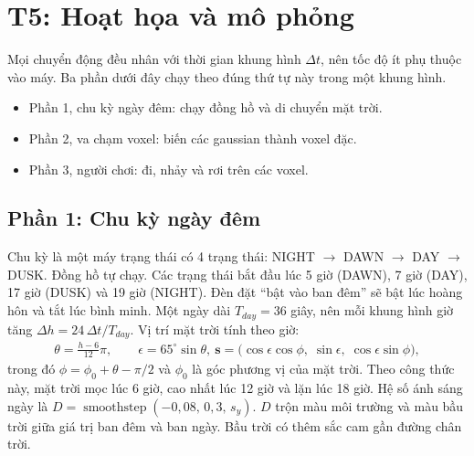 \documentclass[9pt,twocolumn,a4paper]{extarticle}
\begin{document}
\par\noindent{}\par\vspace{3pt}

\par\noindent{}\par\vspace{3pt}

\section{T5: Hoạt họa và mô phỏng}
\label{chap:t5}
Mọi chuyển động đều nhân với thời gian khung hình $\Delta t$, nên tốc độ ít phụ thuộc vào máy. Ba phần dưới đây chạy theo đúng thứ tự này trong một khung hình.
\begin{itemize}\itemsep0pt
\item Phần 1, chu kỳ ngày đêm: chạy đồng hồ và di chuyển mặt trời.
\item Phần 2, va chạm voxel: biến các gaussian thành voxel đặc.
\item Phần 3, người chơi: đi, nhảy và rơi trên các voxel.
\end{itemize}

\subsection{Phần 1: Chu kỳ ngày đêm}
Chu kỳ là một máy trạng thái có 4 trạng thái: NIGHT $\to$ DAWN $\to$ DAY $\to$ DUSK. Đồng hồ tự chạy. Các trạng thái bắt đầu lúc 5 giờ (DAWN), 7 giờ (DAY), 17 giờ (DUSK) và 19 giờ (NIGHT). Đèn đặt ``bật vào ban đêm'' sẽ bật lúc hoàng hôn và tắt lúc bình minh. Một ngày dài $T_{day}=36$ giây, nên mỗi khung hình giờ tăng $\Delta h = 24\,\Delta t/T_{day}$. Vị trí mặt trời tính theo giờ:
\begin{equation}
\begin{gathered}
\theta=\frac{h-6}{12}\pi,\qquad
\epsilon=65^{\circ}\sin\theta,\
\mathbf{s}=\big(\cos\epsilon\cos\phi,\;\sin\epsilon,\;\cos\epsilon\sin\phi\big),
\end{gathered}
\label{eq:sun}
\end{equation}
trong đó $\phi=\phi_0+\theta-\pi/2$ và $\phi_0$ là góc phương vị của mặt trời. Theo công thức này, mặt trời mọc lúc 6 giờ, cao nhất lúc 12 giờ và lặn lúc 18 giờ. Hệ số ánh sáng ngày là $D=\operatorname{smoothstep}(-0{,}08,\,0{,}3,\,s_y)$. $D$ trộn màu môi trường và màu bầu trời giữa giá trị ban đêm và ban ngày. Bầu trời có thêm sắc cam gần đường chân trời.
\end{document}
